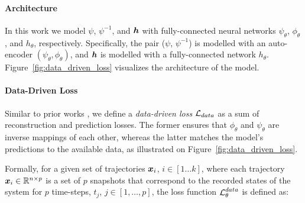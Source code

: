 \paragraph{Architecture} In this work we model $\psi$, $\psi^{-1}$, and $\boldsymbol{h}$ with fully-connected neural networks $\psi_\theta$, $\phi_\theta$, and $h_\theta$, respectively. Specifically, the pair ($\psi$, $\psi^{-1}$) is modelled with an auto-encoder $(\psi_\theta, \phi_\theta)$, and $\boldsymbol{h}$ is modelled with a fully-connected network $h_\theta$. Figure~\ref{fig:data_driven_loss} visualizes the architecture of the model.

\paragraph{Data-Driven Loss} Similar to prior works \citep{takeishi2017learning,morton2019deep,gin2021deep}, we define a \textit{data-driven loss} $\operatorname{\mathcal{L}}_{data}$ as a sum of reconstruction and prediction losses. The former ensures that $\phi_\theta$ and $\psi_\theta$ are inverse mappings of each other, whereas the latter matches the model's predictions to the available data, as illustrated on Figure~\ref{fig:data_driven_loss}.

 Formally, for a given set of trajectories $\boldsymbol{x}_i$, $i \in [1 \dots k]$, where each trajectory $\boldsymbol{x}_i \in \mathbb{R}^{n \times p}$ is a set of $p$ snapshots that correspond to the recorded states of the system for $p$ time-steps, $t_j$, $j \in [1, \dots, p]$, the loss function $\operatorname{\mathcal{L}}^{data}_\theta$ is defined as:

